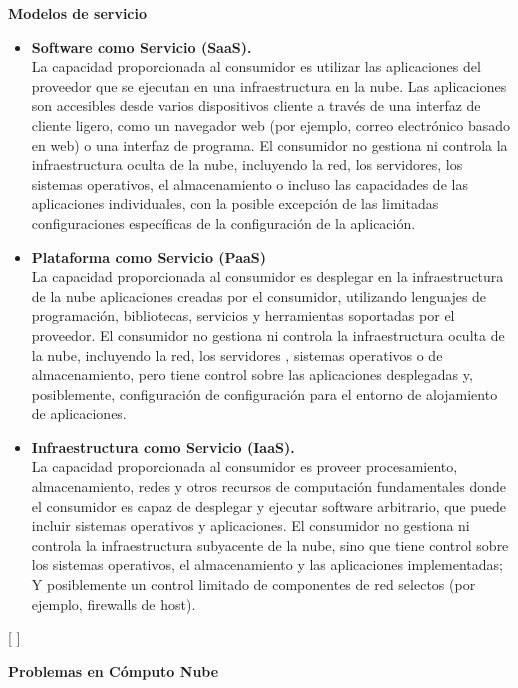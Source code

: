  \textbf{Modelos de servicio }

\begin{itemize}
	\item \textbf {Software como Servicio (SaaS).} \\ La capacidad proporcionada al consumidor es utilizar las aplicaciones del proveedor que se ejecutan en una infraestructura en la nube. Las aplicaciones son accesibles desde varios dispositivos cliente a través de una interfaz de cliente ligero, como un navegador web (por ejemplo, correo electrónico basado en web) o una interfaz de programa. El consumidor no gestiona ni controla la infraestructura oculta de la nube, incluyendo la red, los servidores, los sistemas operativos, el almacenamiento o incluso las capacidades de las aplicaciones individuales, con la posible excepción de las limitadas configuraciones específicas de la configuración de la aplicación.
	\item \textbf {Plataforma como Servicio (PaaS)} \\ La capacidad proporcionada al consumidor es desplegar en la infraestructura de la nube aplicaciones creadas por el consumidor, utilizando lenguajes de programación, bibliotecas, servicios y herramientas soportadas por el proveedor. El consumidor no gestiona ni controla la infraestructura oculta de la nube, incluyendo la red, los servidores , sistemas operativos o de almacenamiento, pero tiene control sobre las aplicaciones desplegadas y, posiblemente, configuración de configuración para el entorno de alojamiento de aplicaciones.
	\item \textbf {Infraestructura como Servicio (IaaS).} \\  La capacidad proporcionada al consumidor es proveer procesamiento, almacenamiento, redes y otros recursos de computación fundamentales donde el consumidor es capaz de desplegar y ejecutar software arbitrario, que puede incluir sistemas operativos y aplicaciones. El consumidor no gestiona ni controla la infraestructura subyacente de la nube, sino que tiene control sobre los sistemas operativos, el almacenamiento y las aplicaciones implementadas; Y posiblemente un control limitado de componentes de red selectos (por ejemplo, firewalls de host). 
\end{itemize}  [  ]

 \textbf{Problemas en Cómputo Nube }

